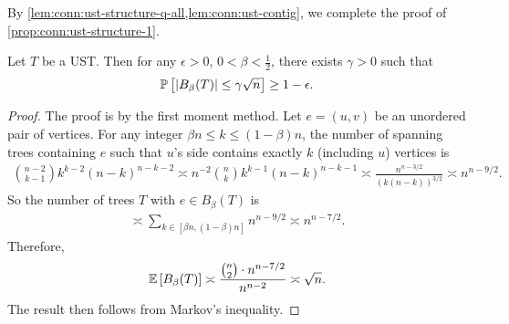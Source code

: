 By \cref{lem:conn:ust-structure-q-all,lem:conn:ust-contig}, we complete the proof of \cref{prop:conn:ust-structure-1}.

\begin{lemma} \label{lem:conn:ust-structure-2}
  Let $T$ be a UST. Then for any $\epsilon>0$, $0<\beta<\frac 12$, there exists $\gamma>0$ such that
  \begin{align*}
    \mathbb{P}\left[ \left| B_\beta(T) \right| \le \gamma \sqrt n \right] \ge 1-\epsilon.
  \end{align*}
\end{lemma}
\begin{proof}
  The proof is by the first moment method.
  Let $e=(u,v)$ be an unordered pair of vertices.
  For any integer $\beta n \le k \le (1-\beta) n$, the number of spanning trees containing $e$ such that $u$'s side contains exactly $k$ (including $u$) vertices is
  \begin{align*}
    \binom{n-2}{k-1} k^{k-2} (n-k)^{n-k-2}
    \asymp n^{-2} \binom nk k^{k-1} (n-k)^{n-k-1}
    \asymp \frac{n^{n-3/2}}{(k(n-k))^{3/2}}
    \asymp n^{n-9/2}.
  \end{align*}
  So the number of trees $T$ with $e\in B_\beta(T)$ is
  \begin{align*}
    \asymp \sum_{k\in [\beta n, (1-\beta) n]} n^{n-9/2} \asymp n^{n-7/2}.
  \end{align*}
  Therefore,
  \begin{align*}
    \mathbb{E} \left[B_\beta(T)\right] \asymp \frac{\binom n2 \cdot n^{n-7/2}}{n^{n-2}} \asymp \sqrt n.
  \end{align*}
  The result then follows from Markov's inequality.
\end{proof}

